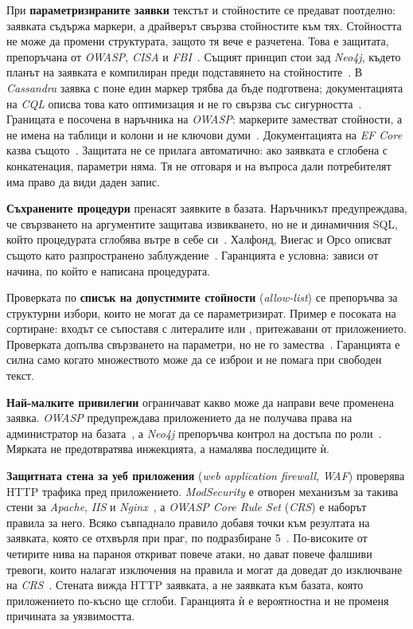 При \textbf{параметризираните заявки} текстът и стойностите се предават поотделно:
заявката съдържа маркери, а драйверът свързва стойностите към тях. Стойността не може
да промени структурата, защото тя вече е разчетена. Това е защитата, препоръчана от
\textit{OWASP}, \textit{CISA} и \textit{FBI}~\cite{owasp_sqli_prevention,cisa_sqli_alert}.
Същият принцип стои зад \textit{Neo4j}, където планът на заявката е компилиран преди
подставянето на стойностите~\cite{neo4j_cypher_injection_kb}. В \textit{Cassandra}
заявка с поне един маркер трябва да бъде подготвена; документацията на \textit{CQL}
описва това като оптимизация и не го свързва със сигурността~\cite{cassandra_cql_prepared}.
Границата е посочена в наръчника на \textit{OWASP}: маркерите заместват стойности, а
не имена на таблици и колони и не ключови думи~\cite{owasp_sqli_prevention}.
Документацията на \textit{EF Core} казва същото~\cite{ef_core_sql}. Защитата не се
прилага автоматично: ако заявката е сглобена с конкатенация, параметри няма. Тя не
отговаря и на въпроса дали потребителят има право да види даден запис.

\textbf{Съхранените процедури} пренасят заявките в базата. Наръчникът предупреждава,
че свързването на аргументите защитава извикването, но не и динамичния SQL, който
процедурата сглобява вътре в себе си~\cite{owasp_sqli_prevention}. Халфонд, Виегас и
Орсо описват същото като разпространено заблуждение~\cite{halfond2006classification}.
Гаранцията е условна: зависи от начина, по който е написана процедурата.

Проверката по \textbf{списък на допустимите стойности} (\textit{allow-list}) се
препоръчва за структурни избори, които не могат да се параметризират. Пример е
посоката на сортиране: входът се съпоставя с литералите  или ,
притежавани от приложението. Проверката допълва свързването на параметри, но не го
замества~\cite{owasp_sqli_prevention}. Гаранцията е силна само когато множеството може
да се изброи и не помага при свободен текст.

\textbf{Най-малките привилегии} ограничават какво може да направи вече променена
заявка. \textit{OWASP} предупреждава приложението да не получава права на
администратор на базата~\cite{owasp_sqli_prevention}, а \textit{Neo4j} препоръчва
контрол на достъпа по роли~\cite{neo4j_cypher_injection_kb}. Мярката не предотвратява
инжекцията, а намалява последиците ѝ.

\textbf{Защитната стена за уеб приложения} (\textit{web application firewall},
\textit{WAF}) проверява HTTP трафика пред приложението. \textit{ModSecurity} е
отворен механизъм за такива стени за \textit{Apache}, \textit{IIS} и
\textit{Nginx}~\cite{modsecurity_repo}, а \textit{OWASP Core Rule Set} (\textit{CRS})
е наборът правила за него. Всяко съвпаднало правило добавя точки към резултата на
заявката, която се отхвърля при праг, по подразбиране 5~\cite{crs_anomaly}.
По-високите от четирите нива на параноя откриват повече атаки, но дават повече
фалшиви тревоги, които налагат изключения на правила и могат да доведат до
изключване на \textit{CRS}~\cite{crs_paranoia}. Стената вижда HTTP заявката, а не
заявката към базата, която приложението по-късно ще сглоби. Гаранцията ѝ е
вероятностна и не променя причината за уязвимостта.

